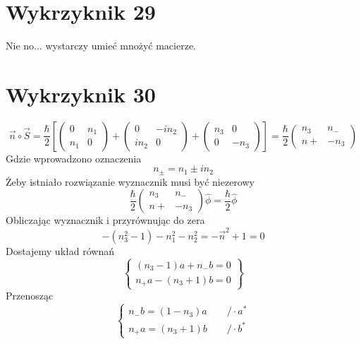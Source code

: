 \documentclass[a4paper,12pt]{article}
\begin{document}
\section{Wykrzyknik 29}
	Nie no... wystarczy umieć mnożyć macierze.

\section{Wykrzyknik 30}
\begin{equation*}
  \vec{n} \circ \vec{S} = \frac{\hbar}{2} \left[ \begin{pmatrix} 0 & n_1 \\ n_1 &
      0 \end{pmatrix} + \begin{pmatrix} 0 & -in_2 \\ in_2 & 0 \end{pmatrix}
    + \begin{pmatrix} n_3 & 0 \\ 0 & -n_3 \end{pmatrix} \right] =
    \frac{\hbar}{2} \begin{pmatrix} n_3 & n_{-} \\ n{+} & -n_3 \end{pmatrix}
\end{equation*}
Gdzie wprowadzono oznaczenia
\begin{equation*}
  n_{\pm} = n_1 \pm in_2
\end{equation*}
Żeby istniało rozwiązanie wyznacznik musi być niezerowy
\begin{equation*}
  \frac{\hbar}{2} \begin{pmatrix} n_3 & n_{-} \\ n{+} & -n_3 \end{pmatrix}
  \hat{\phi} =
  \frac{\hbar}{2} \hat{\phi}
\end{equation*}
Obliczając wyznacznik i przyrównując do zera
\begin{equation*}
  -\left( n_3^2 -1\right) -n_1^2 - n_2^2 = -\vec{n}^2 + 1 = 0
\end{equation*}
Dostajemy układ równań
\begin{equation*}
  \left\{ \begin{gathered}
      (n_3 - 1)a + n_{-} b = 0\\
      n_{+} a - (n_3 +1) b = 0
  \end{gathered} \right\}
\end{equation*}
Przenosząc
\begin{equation*}
  \left\{\begin{gathered}
      n_{-} b = (1-n_3)a \qquad /\cdot a^*\\
      n_{+} a =  (n_3 +1) b \qquad /\cdot b^*
  \end{gathered}\right.
\end{equation*}
\end{document}
